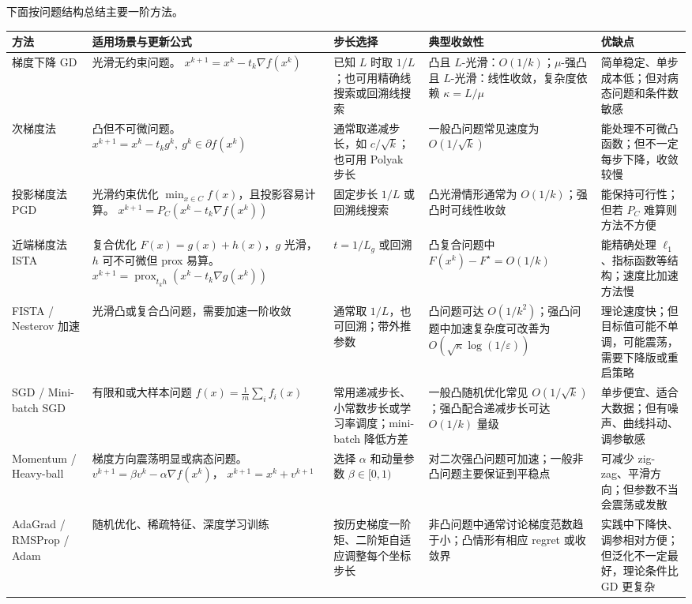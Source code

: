 \documentclass[12pt,a4paper]{article}
\begin{document}
下面按问题结构总结主要一阶方法。
{\small
\renewcommand{\arraystretch}{1.35}
\begin{longtable}{|p{1.8cm}|p{2.9cm}|p{2.5cm}|p{2.9cm}|p{2.7cm}|}
\hline
方法 & 适用场景与更新公式 & 步长选择 & 典型收敛性 & 优缺点 \\
\hline
梯度下降 GD
& 光滑无约束问题。
$x^{k+1}=x^k-t_k\nabla f(x^k)$
& 已知 $L$ 时取 $1/L$；也可用精确线搜索或回溯线搜索
& 凸且 $L$-光滑：$O(1/k)$；$\mu$-强凸且 $L$-光滑：线性收敛，复杂度依赖 $\kappa=L/\mu$
& 简单稳定、单步成本低；但对病态问题和条件数敏感 \\
\hline
次梯度法
& 凸但不可微问题。
$x^{k+1}=x^k-t_kg^k,\ g^k\in\partial f(x^k)$
& 通常取递减步长，如 $c/\sqrt{k}$；也可用 Polyak 步长
& 一般凸问题常见速度为 $O(1/\sqrt{k})$
& 能处理不可微凸函数；但不一定每步下降，收敛较慢 \\
\hline
投影梯度法 PGD
& 光滑约束优化 $\min_{x\in C}f(x)$，且投影容易计算。
$x^{k+1}=P_C(x^k-t_k\nabla f(x^k))$
& 固定步长 $1/L$ 或回溯线搜索
& 凸光滑情形通常为 $O(1/k)$；强凸时可线性收敛
& 能保持可行性；但若 $P_C$ 难算则方法不方便 \\
\hline
近端梯度法 ISTA
& 复合优化 $F(x)=g(x)+h(x)$，$g$ 光滑，$h$ 可不可微但 prox 易算。
$x^{k+1}=\operatorname{prox}_{t_kh}(x^k-t_k\nabla g(x^k))$
& $t=1/L_g$ 或回溯
& 凸复合问题中 $F(x^k)-F^\star=O(1/k)$
& 能精确处理 $\ell_1$、指标函数等结构；速度比加速方法慢 \\
\hline
FISTA / Nesterov 加速
& 光滑凸或复合凸问题，需要加速一阶收敛
& 通常取 $1/L$，也可回溯；带外推参数
& 凸问题可达 $O(1/k^2)$；强凸问题中加速复杂度可改善为 $O(\sqrt{\kappa}\log(1/\varepsilon))$
& 理论速度快；但目标值可能不单调，可能震荡，需要下降版或重启策略 \\
\hline
SGD / Mini-batch SGD
& 有限和或大样本问题 $f(x)=\frac1m\sum_i f_i(x)$
& 常用递减步长、小常数步长或学习率调度；mini-batch 降低方差
& 一般凸随机优化常见 $O(1/\sqrt{k})$；强凸配合递减步长可达 $O(1/k)$ 量级
& 单步便宜、适合大数据；但有噪声、曲线抖动、调参敏感 \\
\hline
Momentum / Heavy-ball
& 梯度方向震荡明显或病态问题。
$v^{k+1}=\beta v^k-\alpha\nabla f(x^k)$，
$x^{k+1}=x^k+v^{k+1}$
& 选择 $\alpha$ 和动量参数 $\beta\in[0,1)$
& 对二次强凸问题可加速；一般非凸问题主要保证到平稳点
& 可减少 zig-zag、平滑方向；但参数不当会震荡或发散 \\
\hline
AdaGrad / RMSProp / Adam
& 随机优化、稀疏特征、深度学习训练
& 按历史梯度一阶矩、二阶矩自适应调整每个坐标步长
& 非凸问题中通常讨论梯度范数趋于小；凸情形有相应 regret 或收敛界
& 实践中下降快、调参相对方便；但泛化不一定最好，理论条件比 GD 更复杂 \\
\hline
\end{longtable}
}
\end{document}
